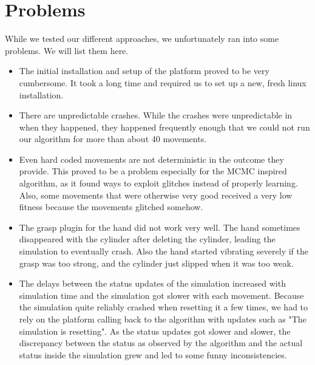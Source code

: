\section{Problems} \label{sec:problems}
While we tested our different approaches, we unfortunately ran into some problems. We will list them here.
\begin{itemize}
	\item The initial installation and setup of the platform proved to be very cumbersome. It took a long time and required us to set up a new, fresh linux installation.
	\item There are unpredictable crashes. While the crashes were unpredictable in when they happened, they happened frequently enough that we could not run our algorithm for more than about 40 movements. 
	\item Even hard coded movements are not deterministic in the outcome they provide. This proved to be a problem especially for the MCMC inspired algorithm, as it found ways to exploit glitches instead of properly learning. Also, some movements that were otherwise very good received a very low fitness because the movements glitched somehow.
	\item The grasp plugin for the hand did not work very well. The hand sometimes disappeared with the cylinder after deleting the cylinder, leading the simulation to eventually crash. Also the hand started vibrating severely if the grasp was too strong, and the cylinder just slipped when it was too weak.
	\item The delays between the status updates of the simulation increased with simulation time and the simulation got slower with each movement. Because the simulation quite reliably crashed when resetting it a few times, we had to rely on the platform calling back to the algorithm with updates such as "The simulation is resetting". As the status updates got slower and slower, the discrepancy between the status as observed by the algorithm and the actual status inside the simulation grew and led to some funny inconsistencies.
\end{itemize}